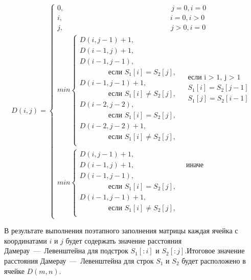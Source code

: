 \documentclass[a4paper, 12pt]{extreport}
\begin{document}
\begin{equation}
	\label{eq:DL}
	D(i, j) = \begin{cases}
	0, \qquad\qquad\qquad\qquad\qquad\qquad\qquad\quad  j = 0, i = 0\\
	i, \qquad\qquad\qquad\qquad\qquad\qquad\qquad\quad  i = 0, i > 0\\
	j,\qquad\qquad\qquad\qquad\qquad\qquad\qquad\quad j > 0, i = 0\\
	min \begin{cases}
		D(i, j - 1) + 1,\\
		D(i - 1, j) + 1,\\
		D(i - 1, j - 1),\\\qquad\qquad\text{если $S_{1}[i]= S_{2}[j]$}, \\
            D(i - 1, j - 1) + 1,\\\qquad\qquad\text{если $S_{1}[i] \neq S_{2}[j]$}, \\
		D(i - 2, j - 2),\\\qquad\qquad\text{если $S_{1}[i]= S_{2}[j]$}, \\
            D(i - 2, j - 2) + 1,\\\qquad\qquad\text{если $S_{1}[i] \neq S_{2}[j]$}, \\
	\end{cases}
	\begin{aligned}
		& \text{если i > 1, j > 1} \\
		& S_{1}[i] = S_{2}[j - 1]  \\
		& S_{1}[j] =  S_{2}[i - 1] \\
	\end{aligned}\\
	min \begin{cases}
		D(i, j - 1) + 1,\\
		D(i - 1, j) + 1, & \;\; \text{иначе}\\
		D(i - 1, j - 1),\\\qquad\qquad\text{если $S_{1}[i]= S_{2}[j]$}, \\
            D(i - 1, j - 1) + 1,\\\qquad\qquad\text{если $S_{1}[i] \neq S_{2}[j]$}, \\
	\end{cases}
	\end{cases}
\end{equation}
\newline

В результате выполнения поэтапного заполнения матрицы каждая ячейка с координатами $i$ и $j$ будет содержать значение расстояния Дамерау~---~Левенштейна для подстрок $S_{1}[:i]$ и $S_{2}[:j]$.Итоговое значение расстояния Дамерау~---~Левенштейна для строк $S_{1}$ и $S_{2}$ будет расположено в ячейке $D(m, n)$.
\end{document}

